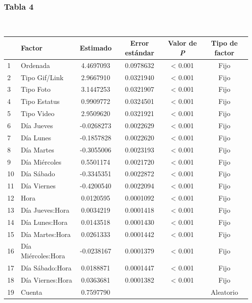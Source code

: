 \documentclass[a4paper,10pt]{article}
\begin{document}
\subsubsection{Tabla 4}
\begin{center}
  \\[0.3cm]
  \begin{tabular}{l|l|c|c|c|c}
    \hline
    & Factor & Estimado & Error estándar & Valor de \textit{P} & Tipo de factor\\
    \hline
    1 & Ordenada & 4.4697093 & 0.0978632 & < 0.001 & Fijo \\
    2 & Tipo Gif/Link & 2.9667910 & 0.0321940 & < 0.001 & Fijo \\
    3 & Tipo Foto & 3.1447253 & 0.0321907 & < 0.001 & Fijo \\
    4 & Tipo Estatus & 0.9909772 & 0.0324501 & < 0.001 & Fijo \\
    5 & Tipo Video & 2.9509620 & 0.0321921 & < 0.001 & Fijo \\
    6 & Día Jueves & -0.0268273 & 0.0022629 & < 0.001 & Fijo \\
    7 & Día Lunes & -0.1857828 & 0.0022620 & < 0.001 & Fijo \\
    8 & Día Martes & -0.3055006 & 0.0023193 & < 0.001 & Fijo \\
    9 & Día Miércoles & 0.5501174 & 0.0021720 & < 0.001 & Fijo \\
    10 & Día Sábado & -0.3345351 & 0.0022872 & < 0.001 & Fijo \\
    11 & Día Viernes & -0.4200540 & 0.0022094 & < 0.001 & Fijo \\
    12 & Hora & 0.0120595 & 0.0001092 & < 0.001 & Fijo \\
    13 & Día Jueves:Hora & 0.0034219 & 0.0001418 & < 0.001 & Fijo \\
    14 & Día Lunes:Hora & 0.0143518 & 0.0001430 & < 0.001 & Fijo \\
    15 & Día Martes:Hora & 0.0261333 & 0.0001442 & < 0.001 & Fijo \\
    16 & Día Miércoles:Hora & -0.0238167 & 0.0001379 & < 0.001 & Fijo \\
    17 & Día Sábado:Hora & 0.0188871 & 0.0001447 & < 0.001 & Fijo \\
    18 & Día Viernes:Hora & 0.0363681 & 0.0001382 & < 0.001 & Fijo \\
    19 & Cuenta & 0.7597790 &  &  & Aleatorio \\
    \hline
  \end{tabular}
\end{center}
\end{document}
